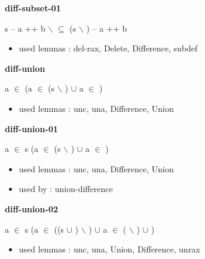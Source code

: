 \documentclass[a4paper]{article}
\begin{document}
\medskip

\bigskip

{\large\bf diff-subset-01}

\medskip

 \Fol s -- a ++ b $\backslash$  $\subseteq$ (s $\backslash$ ) -- a ++ b

\begin{itemize}


\item       used lemmas  : del-rax, Delete, Difference, subdef

\end{itemize}

\medskip

\bigskip

{\large\bf diff-union}

\medskip

 \Fol a $\in$  \Imp (a $\in$ (s $\backslash$ ) $\cup$  \Equiv a $\in$ )

\begin{itemize}


\item       used lemmas  : unc, una, Difference, Union

\end{itemize}

\medskip

\bigskip

{\large\bf diff-union-01}

\medskip

 \Fol \Not a $\in$ s \Imp (a $\in$ (s $\backslash$ ) $\cup$  \Equiv a $\in$ )

\begin{itemize}


\item       used lemmas  : unc, una, Difference, Union
\item       used by      : union-difference

\end{itemize}

\medskip

\bigskip

{\large\bf diff-union-02}

\medskip

 \Fol \Not a $\in$ s \Imp (a $\in$ ((s $\cup$ ) $\backslash$ ) $\cup$  \Equiv a $\in$ ( $\backslash$ ) $\cup$ )

\begin{itemize}


\item       used lemmas  : unc, una, Union, Difference, unrax

\end{itemize}
\end{document}
